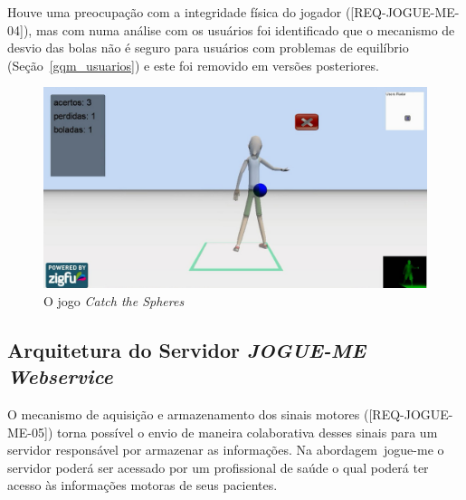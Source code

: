 Houve uma preocupação com a integridade física do jogador ([REQ-JOGUE-ME-04]), mas com numa análise com os usuários foi identificado que o mecanismo de desvio das bolas não é seguro para usuários com problemas de equilíbrio (Seção~\ref{gqm_usuarios}) e este foi removido em versões posteriores.

\begin{figure}[!htb]
     \centering
     \includegraphics[width=.8\textwidth]{./img/catch-the-spheres.png}
     \caption{O jogo \emph{Catch the Spheres}}
     \label{img:catch}
\end{figure}

\subsection{Arquitetura do Servidor \textit{JOGUE-ME Webservice}}
O mecanismo de aquisição e armazenamento dos sinais motores ([REQ-JOGUE-ME-05]) torna possível o envio de maneira colaborativa desses sinais para um servidor responsável por armazenar as informações. Na abordagem~\ac{jogue-me} o servidor poderá ser acessado por um profissional de saúde o qual poderá ter acesso às informações motoras de seus pacientes.



